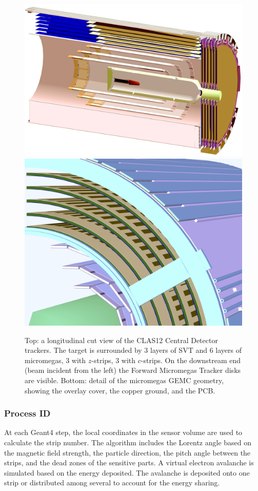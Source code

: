 \begin{figure}
	\centering
	\includegraphics[width=0.99\columnwidth,keepaspectratio]{img/bmtGeometry.png}
	\includegraphics[width=0.99\columnwidth,keepaspectratio]{img/bmtDetail.png}
	\caption{Top: a longitudinal cut view of the CLAS12 Central Detector trackers. The target is surrounded by 3 layers of SVT and
            6 layers of micromegas, 3 with $z$-strips, 3 with $c$-strips. On the downstream end (beam incident from the left)
			the Forward Micromegas Tracker disks are visible.
            Bottom: detail of the micromegas GEMC geometry, showing the overlay cover, the copper ground, and the PCB.}
	\label{fig:bmtGeometry}
\end{figure}


\subsubsection{Process ID}
At each Geant4 step, the local coordinates in the sensor volume are used to calculate the strip number.
The algorithm includes the Lorentz angle based on the magnetic field strength, the particle direction,
the pitch angle between the strips, and the dead zones of the sensitive parts.
A virtual electron avalanche is simulated based on the energy deposited. The avalanche
is deposited onto one strip or distributed among several to account for the energy sharing.



